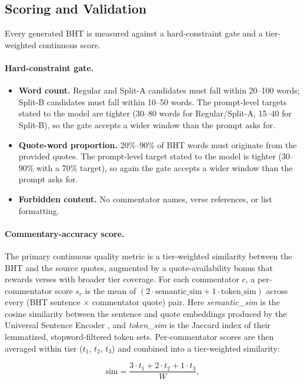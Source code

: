 \subsection{Scoring and Validation}
\label{sec:scoring}

Every generated BHT is measured against a hard-constraint gate and a tier-weighted continuous score.

\paragraph{Hard-constraint gate.}
\begin{itemize}[nosep,leftmargin=*]
    \item \textbf{Word count.} Regular and Split-A candidates must fall within 20--100 words; Split-B candidates must fall within 10--50 words. The prompt-level targets stated to the model are tighter (30--80 words for Regular/Split-A, 15--40 for Split-B), so the gate accepts a wider window than the prompt asks for.
    \item \textbf{Quote-word proportion.} 20\%--90\% of BHT words must originate from the provided quotes. The prompt-level target stated to the model is tighter (30--90\% with a 70\% target), so again the gate accepts a wider window than the prompt asks for.
    \item \textbf{Forbidden content.} No commentator names, verse references, or list formatting.
\end{itemize}

\paragraph{Commentary-accuracy score.} The primary continuous quality metric is a tier-weighted similarity between the BHT and the source quotes, augmented by a quote-availability bonus that rewards verses with broader tier coverage. For each commentator $c$, a per-commentator score $s_c$ is the mean of $(2 \cdot \text{semantic\_sim} + 1 \cdot \text{token\_sim})$ across every (BHT sentence $\times$ commentator quote) pair. Here \emph{semantic\_sim} is the cosine similarity between the sentence and quote embeddings produced by the Universal Sentence Encoder \citep{cer2018use}, and \emph{token\_sim} is the Jaccard index of their lemmatized, stopword-filtered token sets. Per-commentator scores are then averaged within tier ($t_1$, $t_2$, $t_3$) and combined into a tier-weighted similarity:

\[
\text{sim} = \frac{3 \cdot t_1 + 2 \cdot t_2 + 1 \cdot t_3}{W},
\]

